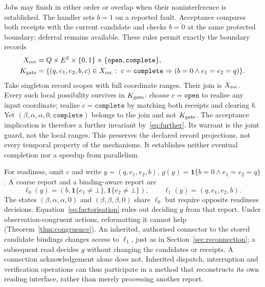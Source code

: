 \documentclass[11pt]{article}
\newcommand{\ind}{\mathbf 1}
\begin{document}
Jobs may finish in either order or overlap when their noninterference is established. The handler sets $b=1$ on a reported fault. Acceptance compares both receipts with the current candidate and checks $b=0$ at the same protected boundary; deferral remains available. These rules permit exactly the boundary records
\begin{equation}\label{eq:workflow}
\begin{split}
X_{\rm rec}&=Q\times E^2\times\{0,1\}\times\{\mathtt{open},\mathtt{complete}\},\\
K_{\rm gate}&=\{(q,e_1,e_2,b,c)\in X_{\rm rec}:\ c=\mathtt{complete}\Rightarrow(b=0\land e_1=e_2=q)\}.
\end{split}
\end{equation}
Take singleton record scopes with full coordinate ranges. Their join is $X_{\rm rec}$. Every such local possibility survives in $K_{\rm gate}$: choose $c=\mathtt{open}$ to realise any input coordinate; realise $c=\mathtt{complete}$ by matching both receipts and clearing $b$. Yet $(\beta,\alpha,\alpha,0,\mathtt{complete})$ belongs to the join and not $K_{\rm gate}$. The acceptance implication is therefore a further invariant by~\eqref{eq:further}. Its warrant is the joint guard, not the local ranges. This preserves the declared record projections, not every temporal property of the mechanisms. It establishes neither eventual completion nor a speedup from parallelism.

For readiness, omit $c$ and write $y=(q,e_1,e_2,b)$, $g(y)=\ind\{b=0\land e_1=e_2=q\}$. A coarse report and a binding-aware report are
\begin{equation}\label{eq:workflowaccess}
\ell_0(y)=(b,\ind\{e_1\ne\bot\},\ind\{e_2\ne\bot\}),\qquad
\ell_1(y)=(q,e_1,e_2,b).
\end{equation}
The states $(\beta,\alpha,\alpha,0)$ and $(\beta,\beta,\beta,0)$ share $\ell_0$ but require opposite readiness decisions. Equation~\eqref{eq:factorisation} rules out deciding $g$ from that report. Under observation-congruent actions, reformatting it cannot help (Theorem~\ref{thm:congruence}). An inherited, authorised connector to the stored candidate bindings changes access to $\ell_1$, just as in Section~\ref{sec:reconnection}; a subsequent read decides $g$ without changing the candidates or receipts. A connection acknowledgement alone does not. Inherited dispatch, interruption and verification operations can thus participate in a method that reconstructs its own reading interface, rather than merely processing another report.
\end{document}
